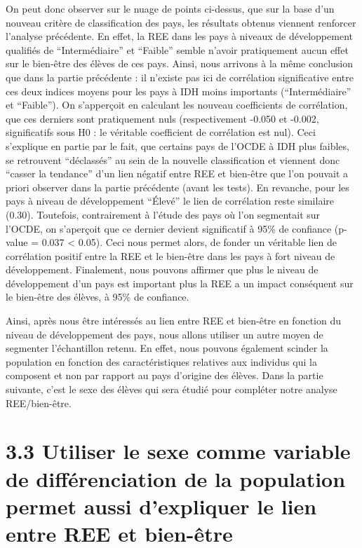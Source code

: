 \documentclass[
  french,
  11pt,
  a4paper,
  oneside]{report}
\begin{document}
On peut donc observer sur le nuage de points ci-dessus, que sur la base
d'un nouveau critère de classification des pays, les résultats obtenus
viennent renforcer l'analyse précédente. En effet, la REE dans les pays
à niveaux de développement qualifiés de ``Intermédiaire'' et ``Faible''
semble n'avoir pratiquement aucun effet sur le bien-être des élèves de
ces pays. Ainsi, nous arrivons à la même conclusion que dans la partie
précédente : il n'existe pas ici de corrélation significative entre ces
deux indices moyens pour les pays à IDH moins importants
(``Intermédiaire'' et ``Faible''). On s'apperçoit en calculant les
nouveau coefficients de corrélation, que ces derniers sont pratiquement
nuls (respectivement -0.050 et -0.002, significatifs sous H0 : le
véritable coefficient de corrélation est nul). Ceci s'explique en partie
par le fait, que certains pays de l'OCDE à IDH plus faibles, se
retrouvent ``déclassés'' au sein de la nouvelle classification et
viennent donc ``casser la tendance'' d'un lien négatif entre REE et
bien-être que l'on pouvait a priori observer dans la partie précédente
(avant les tests). En revanche, pour les pays à niveau de développement
``Élevé'' le lien de corrélation reste similaire (0.30). Toutefois,
contrairement à l'étude des pays où l'on segmentait sur l'OCDE, on
s'aperçoit que ce dernier devient significatif à 95\% de confiance
(p-value = 0.037 \textless{} 0.05). Ceci nous permet alors, de fonder un
véritable lien de corrélation positif entre la REE et le bien-être dans
les pays à fort niveau de développement. Finalement, nous pouvons
affirmer que plus le niveau de développement d'un pays est important
plus la REE a un impact conséquent sur le bien-être des élèves, à 95\%
de confiance.

Ainsi, après nous être intéressés au lien entre REE et bien-être en
fonction du niveau de développement des pays, nous allons utiliser un
autre moyen de segmenter l'échantillon retenu. En effet, nous pouvons
également scinder la population en fonction des caractéristiques
relatives aux individus qui la composent et non par rapport au pays
d'origine des élèves. Dans la partie suivante, c'est le sexe des élèves
qui sera étudié pour compléter notre analyse REE/bien-être.

\section{3.3 Utiliser le sexe comme variable de différenciation de la
population permet aussi d'expliquer le lien entre REE et
bien-être}\label{utiliser-le-sexe-comme-variable-de-diffuxe9renciation-de-la-population-permet-aussi-dexpliquer-le-lien-entre-ree-et-bien-uxeatre}
\end{document}
